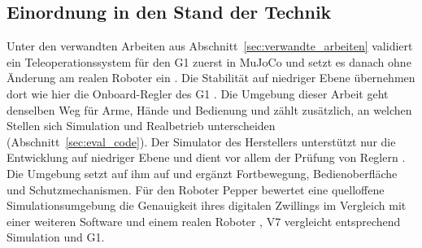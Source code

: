 \subsection{Einordnung in den Stand der Technik}
\label{sec:einordnung}
Unter den verwandten Arbeiten aus Abschnitt~\ref{sec:verwandte_arbeiten} validiert ein Teleoperationssystem für den G1 zuerst in MuJoCo und setzt es danach ohne Änderung am realen Roboter ein \cite{Durrani2026}.
Die Stabilität auf niedriger Ebene übernehmen dort wie hier die Onboard-Regler des G1 \cite{Durrani2026}.
Die Umgebung dieser Arbeit geht denselben Weg für Arme, Hände und Bedienung und zählt zusätzlich, an welchen Stellen sich Simulation und Realbetrieb unterscheiden (Abschnitt~\ref{sec:eval_code}).
Der Simulator des Herstellers unterstützt nur die Entwicklung auf niedriger Ebene und dient vor allem der Prüfung von Reglern \cite{UnitreeMujoco}.
Die Umgebung setzt auf ihm auf und ergänzt Fortbewegung, Bedienoberfläche und Schutzmechanismen.
Für den Roboter Pepper bewertet eine quelloffene Simulationsumgebung die Genauigkeit ihres digitalen Zwillings im Vergleich mit einer weiteren Software und einem realen Roboter \cite{Sekkat2024}, V7 vergleicht entsprechend Simulation und G1.

